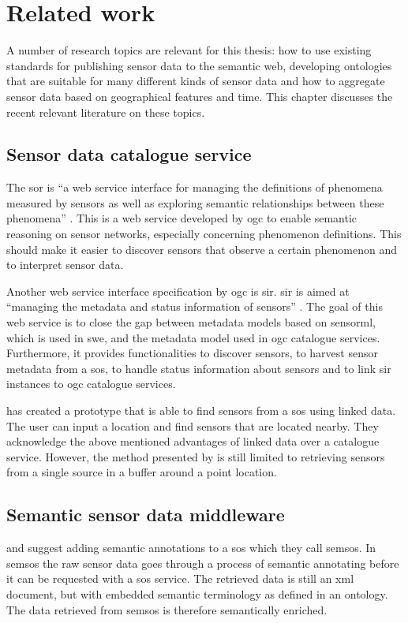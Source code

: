 

\chapter{Related work}
\label{chap:rw}
A number of research topics are relevant for this thesis: how to use existing standards for publishing sensor data to the semantic web, developing ontologies that are suitable for many different kinds of sensor data and how to aggregate sensor data based on geographical features and time. This chapter discusses the recent relevant literature on these topics.     

\section{Sensor data catalogue service}
The \ac{sor} is \enquote{a web service interface for managing the definitions of phenomena measured by sensors as well as exploring semantic relationships between these phenomena} \cite[p. vi]{SW:OGC4}. This is a web service developed by \ac{ogc} to enable semantic reasoning on sensor networks, especially concerning phenomenon definitions. This should make it easier to discover sensors that observe a certain phenomenon and to interpret sensor data.

Another web service interface specification by \ac{ogc} is \ac{sir}. \ac{sir} is aimed at \enquote{managing the metadata and status information of sensors} \cite[p. xii]{SW:OGC3}. The goal of this web service is to close the gap between metadata models based on \ac{sensorml}, which is used in \ac{swe}, and the metadata model used in \ac{ogc} catalogue services. Furthermore, it provides functionalities to discover sensors, to harvest sensor metadata from a \ac{sos}, to handle status information about sensors and to link \ac{sir} instances to \ac{ogc} catalogue services. 

\cite{SSW:Pschorr2} has created a prototype that is able to find sensors from a \ac{sos} using linked data. The user can input a location and find sensors that are located nearby. They acknowledge the above mentioned advantages of linked data over a catalogue service. However, the method presented by \cite{SSW:Pschorr2} is still limited to retrieving sensors from a single source in a buffer around a point location.  

\section{Semantic sensor data middleware}
\cite{SSW:Henson} and \cite{SSW:Pschorr} suggest adding semantic annotations to a \ac{sos} which they call \ac{semsos}. In \ac{semsos} the raw sensor data goes through a process of semantic annotating before it can be requested with a \ac{sos} service. The retrieved data is still an \ac{xml} document, but with embedded semantic terminology as defined in an ontology. The data retrieved from \ac{semsos} is therefore semantically enriched.  

